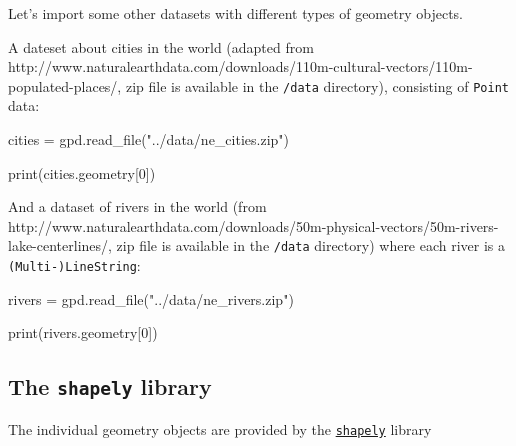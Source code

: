 \documentclass[
  letterpaper,
  DIV=11,
  numbers=noendperiod]{scrreprt}
\newenvironment{Shaded}{\begin{snugshade}}{\end{snugshade}}
\newcommand{\BuiltInTok}[1]{\textcolor[rgb]{0.00,0.23,0.31}{#1}}
\newcommand{\DecValTok}[1]{\textcolor[rgb]{0.68,0.00,0.00}{#1}}
\newcommand{\NormalTok}[1]{\textcolor[rgb]{0.00,0.23,0.31}{#1}}
\newcommand{\OperatorTok}[1]{\textcolor[rgb]{0.37,0.37,0.37}{#1}}
\newcommand{\StringTok}[1]{\textcolor[rgb]{0.13,0.47,0.30}{#1}}
\begin{document}
Let's import some other datasets with different types of geometry
objects.

A dateset about cities in the world (adapted from
http://www.naturalearthdata.com/downloads/110m-cultural-vectors/110m-populated-places/,
zip file is available in the \texttt{/data} directory), consisting of
\texttt{Point} data:

\begin{Shaded}
\begin{Highlighting}[]
\NormalTok{cities }\OperatorTok{=}\NormalTok{ gpd.read\_file(}\StringTok{"../data/ne\_cities.zip"}\NormalTok{)}
\end{Highlighting}
\end{Shaded}

\begin{Shaded}
\begin{Highlighting}[]
\BuiltInTok{print}\NormalTok{(cities.geometry[}\DecValTok{0}\NormalTok{])}
\end{Highlighting}
\end{Shaded}

And a dataset of rivers in the world (from
http://www.naturalearthdata.com/downloads/50m-physical-vectors/50m-rivers-lake-centerlines/,
zip file is available in the \texttt{/data} directory) where each river
is a \texttt{(Multi-)LineString}:

\begin{Shaded}
\begin{Highlighting}[]
\NormalTok{rivers }\OperatorTok{=}\NormalTok{ gpd.read\_file(}\StringTok{"../data/ne\_rivers.zip"}\NormalTok{)}
\end{Highlighting}
\end{Shaded}

\begin{Shaded}
\begin{Highlighting}[]
\BuiltInTok{print}\NormalTok{(rivers.geometry[}\DecValTok{0}\NormalTok{])}
\end{Highlighting}
\end{Shaded}

\hypertarget{the-shapely-library}{%
\subsection{\texorpdfstring{The \texttt{shapely}
library}{The shapely library}}\label{the-shapely-library}}

The individual geometry objects are provided by the
\href{https://shapely.readthedocs.io/en/stable/}{\texttt{shapely}}
library
\end{document}
